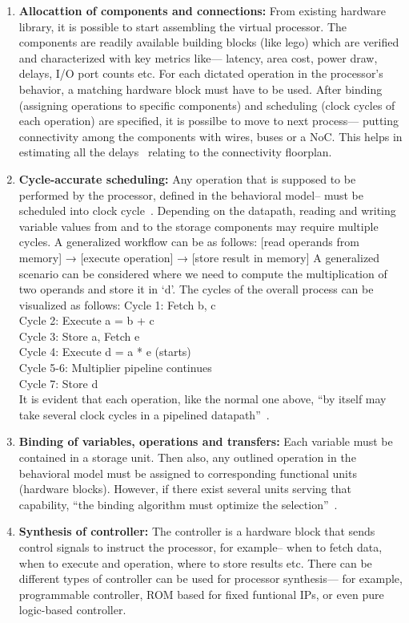 \begin{enumerate}[label=(\alph*)]
    \item \textbf{Allocattion of components and connections:} From existing hardware library, it is possible to start assembling the virtual processor. The components are readily available building blocks (like lego) which are verified and characterized with key metrics like--- latency, area cost, power draw, delays, I/O port counts etc. For each dictated operation in the processor's behavior, a matching hardware block must have to be used. After binding (assigning operations to specific components) and scheduling (clock cycles of each operation) are specified, it is possilbe to move to next process--- putting connectivity among the components with wires, buses or a NoC. This helps in estimating all the delays~\cite{Gajski.2009} relating to the connectivity floorplan.
    \item \textbf{Cycle-accurate scheduling:} Any operation that is supposed to be performed by the processor, defined in the behavioral model-- must be scheduled into clock cycle~\cite{Gajski.2009}. Depending on the datapath, reading and writing variable values from and to the storage components may require multiple cycles. A generalized workflow can be as follows:  
    [read operands from memory] → [execute operation] → [store result in memory]
    A generalized scenario can be considered where we need to compute the multiplication of two operands and store it in `d'. The cycles of the overall process can be visualized as follows:
    Cycle 1: Fetch b, c\\
    Cycle 2: Execute a = b + c\\
    Cycle 3: Store a, Fetch e\\
    Cycle 4: Execute d = a * e (starts)\\
    Cycle 5-6: Multiplier pipeline continues\\
    Cycle 7: Store d\\
    It is evident that each operation, like the normal one above, ``by itself may take several clock cycles in a pipelined datapath''~\cite{Gajski.2009}.
    \item  \textbf{Binding of variables, operations and transfers:} Each variable must be contained in a storage unit. Then also, any outlined operation in the behavioral model must be assigned to corresponding functional units (hardware blocks). However, if there exist several units serving that capability, ``the binding algorithm must optimize the selection''~\cite{Gajski.2009}. 
    \item  \textbf{Synthesis of controller:} The controller is a hardware block that sends control signals to instruct the processor, for example-- when to fetch data, when to execute and operation, where to store results etc. There can be different types of controller can be used for processor synthesis--- for example, programmable controller, ROM based for fixed funtional IPs, or even pure logic-based controller.     

\end{enumerate}
